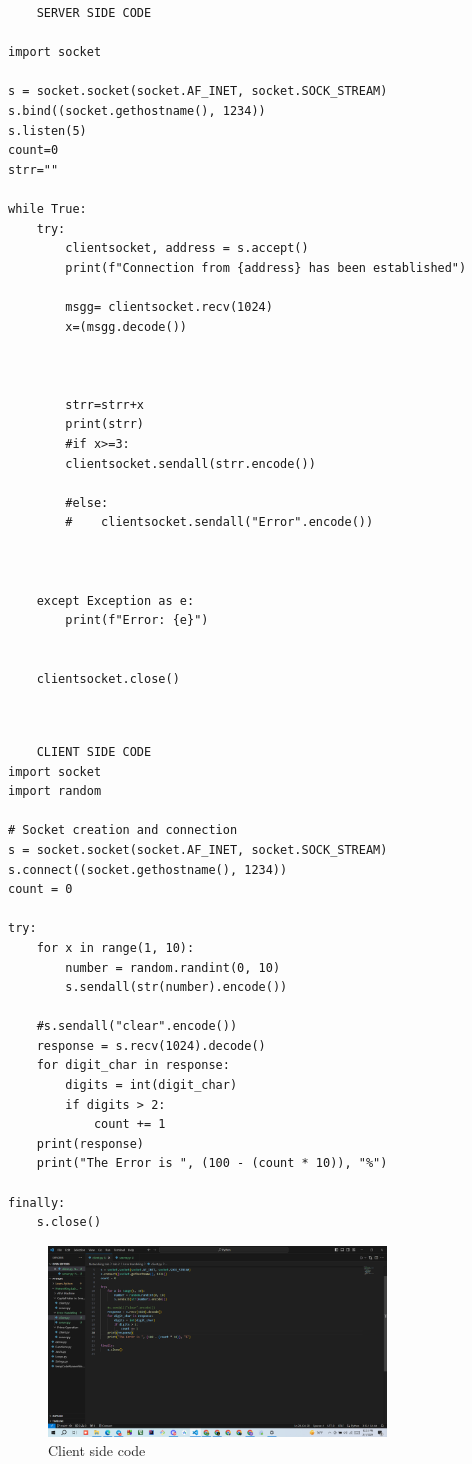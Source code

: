 \documentclass[11pt]{article}
\begin{document}
\begin{itemize}
    
    
    
    \begin{verbatim}
    SERVER SIDE CODE
   
import socket

s = socket.socket(socket.AF_INET, socket.SOCK_STREAM)
s.bind((socket.gethostname(), 1234))
s.listen(5)
count=0
strr=""

while True:
    try:
        clientsocket, address = s.accept()
        print(f"Connection from {address} has been established")
      
        msgg= clientsocket.recv(1024)
        x=(msgg.decode())
        
        
       
        strr=strr+x
        print(strr)
        #if x>=3:
        clientsocket.sendall(strr.encode())
    
        #else:
        #    clientsocket.sendall("Error".encode())
            

        
    except Exception as e:
        print(f"Error: {e}")


    clientsocket.close()



\end{verbatim}


    \begin{verbatim}
    CLIENT SIDE CODE
import socket
import random

# Socket creation and connection
s = socket.socket(socket.AF_INET, socket.SOCK_STREAM)
s.connect((socket.gethostname(), 1234))
count = 0

try:
    for x in range(1, 10):
        number = random.randint(0, 10)
        s.sendall(str(number).encode())
          
    #s.sendall("clear".encode())    
    response = s.recv(1024).decode() 
    for digit_char in response:
        digits = int(digit_char)
        if digits > 2:
            count += 1
    print(response)
    print("The Error is ", (100 - (count * 10)), "%")

finally:
    s.close()

\end{verbatim}
    \begin{figure}[H]
        \centering
        \includegraphics[width=0.8\textwidth]{Error_client.png}
        \caption{Client side code}
        \label{fig:1}
    \end{figure}
    

\end{itemize}
\end{document}
